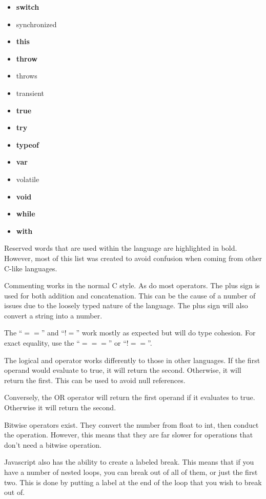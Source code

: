 \begin{multicols}{3}
\begin{itemize}
					\item \textbf{switch}
					\item synchronized
					\item \textbf{this}
					\item \textbf{throw}
					\item throws
					\item transient
					\item \textbf{true}
					\item \textbf{try}
					\item \textbf{typeof}
					\item \textbf{var} 
					\item volatile
					\item \textbf{void}
					\item \textbf{while}
					\item \textbf{with}
				\end{itemize}
			\end{multicols}
			Reserved words that are used within the language are highlighted in bold. 
			However, most of this list was created to avoid confusion when coming from other C-like languages. 

			Commenting works in the normal C style. 
			As do most operators. 
			The plus sign is used for both addition and concatenation. 
			This can be the cause of a number of issues due to the loosely typed nature of the language. 
			The plus sign will also convert a string into a number. 

			The ``$==$'' and ``$!=$'' work mostly as expected but will do type cohesion. 
			For exact equality, use the ``$===$'' or ``$!==$''. 

			The logical and operator works differently to those in other languages. 
			If the first operand would evaluate to true, it will return the second.
			Otherwise, it will return the first. 
			This can be used to avoid null references. 

			Conversely, the OR operator will return the first operand if it evaluates to true. 
			Otherwise it will return the second. 

			Bitwise operators exist. 
			They convert the number from float to int, then conduct the operation. 
			However, this means that they are far slower for operations that don't need a bitwise operation. 

			Javascript also has the ability to create a labeled break. 
			This means that if you have a number of nested loops, you can break out of all of them, or just the first two. 
			This is done by putting a label at the end of the loop that you wish to break out of. 

